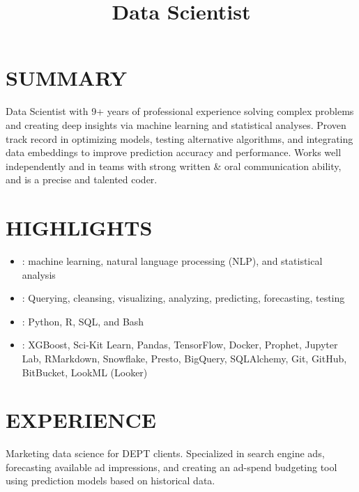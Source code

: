 \documentclass[resmargin, centered, 10pt]{res}
\begin{document}
\address{\href{mailto:kirkwood.donavin@gmail.com}{Kirkwood.Donavin@Gmail.com}}
\address{+1 (801) 554-6834}
\address{}
\address{}

\begin{resume}
	
\fullline

\section{SUMMARY}

Data Scientist with 9+ years of professional experience solving complex problems and creating deep insights via machine learning and statistical analyses. Proven track record in optimizing
models, testing alternative algorithms, and integrating data embeddings to improve prediction accuracy and performance. Works well independently and in teams with strong written \& oral communication ability, and is a precise and talented coder.

\fullline

\section{HIGHLIGHTS}

\begin{itemize}[topsep=0pt]
	\item {}: machine learning, natural language processing (NLP), and statistical analysis
	\item {}: Querying, cleansing, visualizing, analyzing, predicting, forecasting, testing
	\item {}: Python, R, SQL, and Bash
	\item {}: XGBoost, Sci-Kit Learn, Pandas, TensorFlow, Docker, Prophet, Jupyter Lab, RMarkdown, Snowflake, Presto, BigQuery, SQLAlchemy, Git, GitHub, BitBucket, LookML (Looker)
\end{itemize}
\fullline
 
\section{EXPERIENCE}

\title{Data Scientist}
\begin{position}
	Marketing data science for DEPT clients. Specialized in search engine ads, forecasting available ad impressions, and creating an ad-spend budgeting tool using prediction models based on historical data.


\end{position}
\end{resume}
\end{document}
